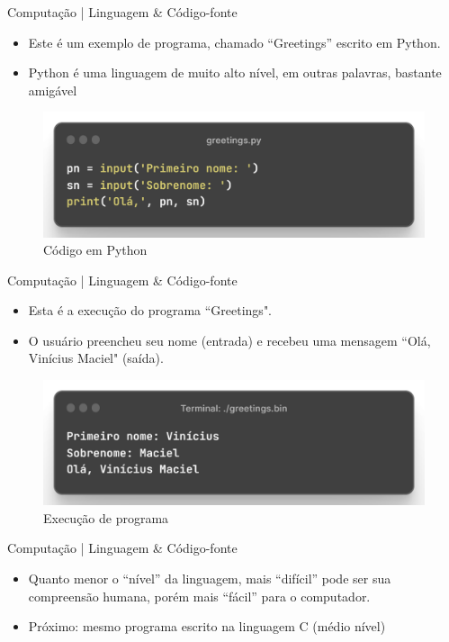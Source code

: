 \documentclass{beamer}
\begin{document}
\begin{frame}{Computação | Linguagem \& Código-fonte}
    \begin{itemize}
        \item Este é um exemplo de programa, chamado ``Greetings'' escrito em Python.
        \item Python é uma linguagem de muito alto nível, em outras palavras, bastante amigável
    \end{itemize}
    \begin{figure}
        \centering
        \includegraphics[width=0.7\linewidth]{img/greetings-code/greetings-python.png}
        \caption{Código em Python}
    \end{figure}
\end{frame}

\begin{frame}{Computação | Linguagem \& Código-fonte}
    \begin{itemize}
        \item Esta é a execução do programa ``Greetings".
        \item O usuário preencheu seu nome (entrada) e recebeu uma mensagem ``Olá, Vinícius Maciel" (saída).
    \end{itemize}
    \begin{figure}
        \centering
        \includegraphics[width=0.7\linewidth]{img/greetings-code/greetings-terminal.png}
        \caption{Execução de programa}
    \end{figure}
\end{frame}

\begin{frame}{Computação | Linguagem \& Código-fonte}
    \begin{itemize}
        \item Quanto menor o ``nível'' da linguagem, mais ``difícil'' pode ser sua compreensão humana, porém mais ``fácil'' para o computador.
        \item Próximo: mesmo programa escrito na linguagem C (médio nível)
    \end{itemize}
\end{frame}
\end{document}
